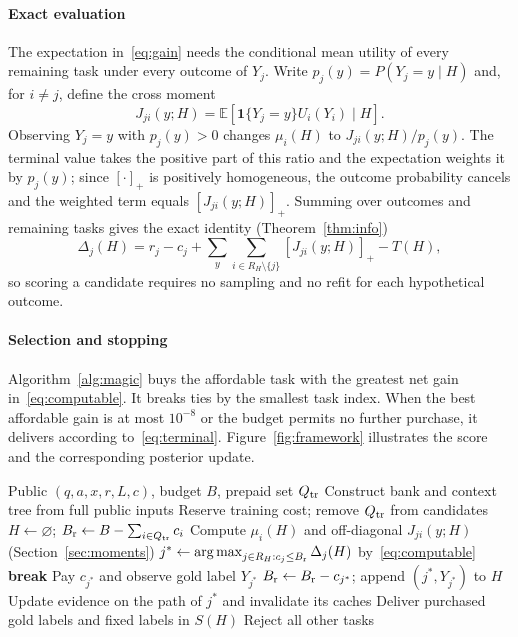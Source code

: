 \documentclass[journal]{IEEEtran}
\newcommand{\E}{\mathbb{E}}
\newcommand{\ind}{\mathbf{1}}
\newcommand{\pos}[1]{[#1]_+}
\DeclareMathOperator*{\argmax}{arg\,max}
\begin{document}
\paragraph{Exact evaluation}
The expectation in~\eqref{eq:gain} needs the conditional mean utility of every remaining task under every outcome of $Y_j$. Write $p_j(y)=P(Y_j=y\mid H)$ and, for $i\ne j$, define the cross moment
\begin{equation}
 J_{ji}(y;H)=\E[\ind\{Y_j=y\}U_i(Y_i)\mid H].
 \label{eq:cross}
\end{equation}
Observing $Y_j=y$ with $p_j(y)>0$ changes $\mu_i(H)$ to $J_{ji}(y;H)/p_j(y)$. The terminal value takes the positive part of this ratio and the expectation weights it by $p_j(y)$; since $\pos{\cdot}$ is positively homogeneous, the outcome probability cancels and the weighted term equals $\pos{J_{ji}(y;H)}$. Summing over outcomes and remaining tasks gives the exact identity (Theorem~\ref{thm:info})
\begin{equation}
 \Delta_j(H)=r_j-c_j+
 \sum_y\sum_{i\in R_H\setminus\{j\}}\pos{J_{ji}(y;H)}-T(H),
 \label{eq:computable}
\end{equation}
so scoring a candidate requires no sampling and no refit for each hypothetical outcome.

\paragraph{Selection and stopping}
Algorithm~\ref{alg:magic} buys the affordable task with the greatest net gain in~\eqref{eq:computable}. It breaks ties by the smallest task index. When the best affordable gain is at most $10^{-8}$ or the budget permits no further purchase, it delivers according to~\eqref{eq:terminal}. Figure~\ref{fig:framework} illustrates the score and the corresponding posterior update.

\begin{algorithm}[t]
\caption{MAGIC: paid verification and selective delivery}
\label{alg:magic}
\begin{algorithmic}[1]
\Require Public $(q,a,x,r,L,c)$, budget $B$, prepaid set $Q_{\rm tr}$
\State Construct bank and context tree from full public inputs
\State Reserve training cost; remove $Q_{\rm tr}$ from candidates
\State $H\gets\varnothing$; $B_{\rm r}\gets B-\sum_{i\in Q_{\rm tr}}c_i$
 \State Compute $\mu_i(H)$ and off-diagonal $J_{ji}(y;H)$ (Section~\ref{sec:moments})
 \State $j^*\gets\argmax_{j\in R_H:c_j\le B_{\rm r}}\Delta_j(H)$ by~\eqref{eq:computable}
   \State \textbf{break}
 \EndIf
 \State Pay $c_{j^*}$ and observe gold label $Y_{j^*}$
 \State $B_{\rm r}\gets B_{\rm r}-c_{j^*}$; append $(j^*,Y_{j^*})$ to $H$
 \State Update evidence on the path of $j^*$ and invalidate its caches
\EndWhile
\State Deliver purchased gold labels and fixed labels in $S(H)$
\State Reject all other tasks
\end{algorithmic}
\end{algorithm}
\end{document}
